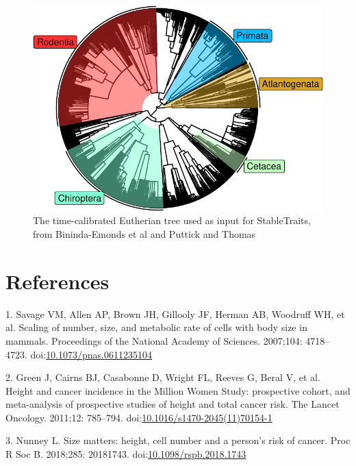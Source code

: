 \documentclass[]{elsarticle} %
\begin{document}
\begin{figure}

\includegraphics[width=6in]{paper_PLOS_draft_files/figure-latex/Figure-TimeTree-Eutheria-1} \hfill{}

\caption{The time-calibrated Eutherian tree used as input for StableTraits, from Bininda-Emonds et al and Puttick and Thomas}\label{fig:Figure-TimeTree-Eutheria}
\end{figure}

\hypertarget{references}{%
\section*{References}\label{references}}

\hypertarget{refs}{}
\leavevmode\hypertarget{ref-Savage2007}{}%
1. Savage VM, Allen AP, Brown JH, Gillooly JF, Herman AB, Woodruff WH, et al. Scaling of number, size, and metabolic rate of cells with body size in mammals. Proceedings of the National Academy of Sciences. 2007;104: 4718--4723. doi:\href{https://doi.org/10.1073/pnas.0611235104}{10.1073/pnas.0611235104}

\leavevmode\hypertarget{ref-Green2011}{}%
2. Green J, Cairns BJ, Casabonne D, Wright FL, Reeves G, Beral V, et al. Height and cancer incidence in the Million Women Study: prospective cohort, and meta-analysis of prospective studies of height and total cancer risk. The Lancet Oncology. 2011;12: 785--794. doi:\href{https://doi.org/10.1016/s1470-2045(11)70154-1}{10.1016/s1470-2045(11)70154-1}

\leavevmode\hypertarget{ref-Nunney:20181c2}{}%
3. Nunney L. Size matters: height, cell number and a person's risk of cancer. Proc R Soc B. 2018;285: 20181743. doi:\href{https://doi.org/10.1098/rspb.2018.1743}{10.1098/rspb.2018.1743}
\end{document}
